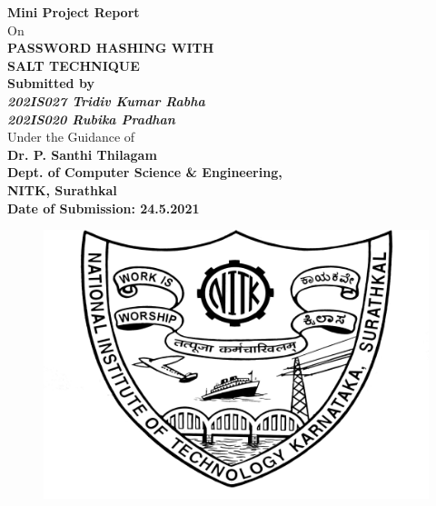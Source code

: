\documentclass{article}[12pt,a4paper]
\begin{document}
\begin{titlepage}

    \centering
    \vspace{-3em}
    {\Large\textbf{Mini Project Report}}\\
    \vspace{1.5em}
    On\\
    \vspace{1.5em}
    {\Huge \textbf{PASSWORD HASHING WITH}}\\
    \vspace{0.5em}
    {\Huge \textbf{SALT TECHNIQUE}}\\
    \vspace{2em}
    {\LARGE \bfseries Submitted by}\\
    \vspace{1em}
    {\Large \emph{\textbf{202IS027  Tridiv Kumar Rabha}}}\\
    {\Large \emph{\textbf{202IS020  Rubika Pradhan}\\
    }}
    \vspace{4em}
    {\Large Under the Guidance of}\\
    \vspace{2em}
    {\Large \textbf{Dr. P. Santhi Thilagam}}\\
    \vspace{2em}
    {\Large \textbf{Dept. of Computer Science \& Engineering,}}\\
    \vspace{1em}
    {\Large \textbf{NITK, Surathkal}}\\
    \vspace{2em}
    {\Large \textbf{Date of Submission: 24.5.2021}}\\
    \begin{figure}[!ht]
        \centering
        \includegraphics{nitk-logo.png}

\end{figure}
\end{titlepage}
\end{document}
